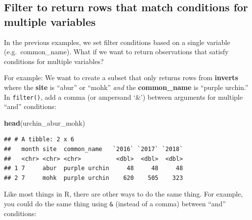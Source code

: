 \documentclass[]{book}
\newenvironment{Shaded}{\begin{snugshade}}{\end{snugshade}}
\newcommand{\CommentTok}[1]{\textcolor[rgb]{0.56,0.35,0.01}{\textit{#1}}}
\newcommand{\KeywordTok}[1]{\textcolor[rgb]{0.13,0.29,0.53}{\textbf{#1}}}
\newcommand{\NormalTok}[1]{#1}
\newcommand{\OperatorTok}[1]{\textcolor[rgb]{0.81,0.36,0.00}{\textbf{#1}}}
\newcommand{\StringTok}[1]{\textcolor[rgb]{0.31,0.60,0.02}{#1}}
\begin{document}
\hypertarget{filter-to-return-rows-that-match-conditions-for-multiple-variables}{%
\subsection{Filter to return rows that match conditions for multiple variables}\label{filter-to-return-rows-that-match-conditions-for-multiple-variables}}

In the previous examples, we set filter conditions based on a single variable (e.g.~common\_name). What if we want to return observations that satisfy conditions for multiple variables?

For example: We want to create a subset that only returns rows from \textbf{inverts} where the \textbf{site} is ``abur'' or ``mohk'' \emph{and} the \textbf{common\_name} is ``purple urchin.'' In \texttt{filter()}, add a comma (or ampersand `\&') between arguments for multiple ``and'' conditions:

\begin{Shaded}
\end{Shaded}

\begin{Shaded}
\begin{Highlighting}[]
\KeywordTok{head}\NormalTok{(urchin_abur_mohk)}
\end{Highlighting}
\end{Shaded}

\begin{verbatim}
## # A tibble: 2 x 6
##   month site  common_name   `2016` `2017` `2018`
##   <chr> <chr> <chr>          <dbl>  <dbl>  <dbl>
## 1 7     abur  purple urchin     48     48     48
## 2 7     mohk  purple urchin    620    505    323
\end{verbatim}

Like most things in R, there are other ways to do the same thing. For example, you could do the same thing using \texttt{\&} (instead of a comma) between ``and'' conditions:

\begin{Shaded}
\end{Shaded}
\end{document}
